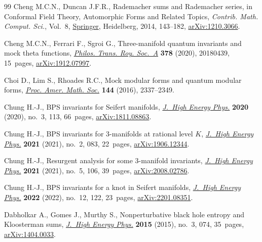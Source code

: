 \begin{thebibliography}{99}
Cheng M.C.N., Duncan J.F.R., Rademacher sums and {R}ademacher series, in
 Conformal {F}ield {T}heory, {A}utomorphic {F}orms and {R}elated {T}opics,
 \textit{Contrib. Math. Comput. Sci.}, Vol.~8, \href{https://doi.org/10.1007/978-3-662-43831-2_6}{Springer}, Heidelberg, 2014,
 143--182, \href{https://arxiv.org/abs/#2}{arXiv:1210.3066}.

Cheng M.C.N., Ferrari F., Sgroi G., Three-manifold quantum invariants and mock
 theta functions, \href{https://doi.org/10.1098/rsta.2018.0439}{\textit{Philos. Trans. Roy. Soc.~A}} \textbf{378} (2020),
 20180439, 15~pages, \href{https://arxiv.org/abs/1912.07997}{arXiv:1912.07997}.

Choi D., Lim S., Rhoades R.C., Mock modular forms and quantum modular forms,
 \href{https://doi.org/10.1090/proc/12907}{\textit{Proc. Amer. Math. Soc.}} \textbf{144} (2016), 2337--2349.

Chung H.-J., B{PS} invariants for {S}eifert manifolds, \href{https://doi.org/10.1007/jhep03(2020)113}{\textit{J.~High Energy
 Phys.}} \textbf{2020} (2020), no.~3, 113, 66~pages, \href{https://arxiv.org/abs/1811.08863}{arXiv:1811.08863}.

Chung H.-J., B{PS} invariants for 3-manifolds at rational level {$K$},
 \href{https://doi.org/10.1007/jhep02(2021)083}{\textit{J.~High Energy Phys.}} \textbf{2021} (2021), no.~2, 083, 22~pages,
 \href{https://arxiv.org/abs/1906.12344}{arXiv:1906.12344}.

Chung H.-J., Resurgent analysis for some 3-manifold invariants, \href{https://doi.org/10.1007/jhep05(2021)106}{\textit{J.~High
 Energy Phys.}} \textbf{2021} (2021), no.~5, 106, 39~pages,
 \href{https://arxiv.org/abs/2008.02786}{arXiv:2008.02786}.

Chung H.-J., B{PS} invariants for a knot in {S}eifert manifolds, \href{https://doi.org/10.1007/jhep12(2022)122}{\textit{J.~High
 Energy Phys.}} \textbf{2022} (2022), no.~12, 122, 23~pages,
 \href{https://arxiv.org/abs/2201.08351}{arXiv:2201.08351}.

Dabholkar A., Gomes J., Murthy S., Nonperturbative black hole entropy and
 {K}loosterman sums, \href{https://doi.org/10.1007/JHEP03(2015)074}{\textit{J.~High Energy Phys.}} \textbf{2015} (2015),
 no.~3, 074, 35~pages, \href{https://arxiv.org/abs/1404.0033}{arXiv:1404.0033}.


\end{thebibliography}
